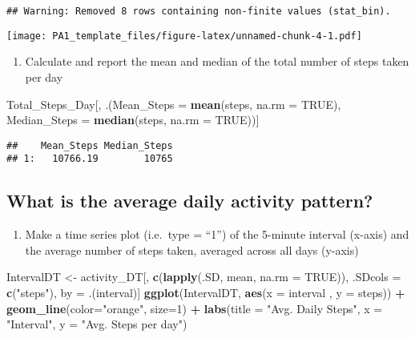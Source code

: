 \documentclass[]{article}
\newenvironment{Shaded}{\begin{snugshade}}{\end{snugshade}}
\newcommand{\KeywordTok}[1]{\textcolor[rgb]{0.13,0.29,0.53}{\textbf{#1}}}
\newcommand{\DataTypeTok}[1]{\textcolor[rgb]{0.13,0.29,0.53}{#1}}
\newcommand{\DecValTok}[1]{\textcolor[rgb]{0.00,0.00,0.81}{#1}}
\newcommand{\StringTok}[1]{\textcolor[rgb]{0.31,0.60,0.02}{#1}}
\newcommand{\OtherTok}[1]{\textcolor[rgb]{0.56,0.35,0.01}{#1}}
\newcommand{\OperatorTok}[1]{\textcolor[rgb]{0.81,0.36,0.00}{\textbf{#1}}}
\newcommand{\NormalTok}[1]{#1}
\providecommand{\tightlist}{%
  \setlength{\itemsep}{0pt}\setlength{\parskip}{0pt}}
\begin{document}
\begin{verbatim}
## Warning: Removed 8 rows containing non-finite values (stat_bin).
\end{verbatim}

\texttt{[image: PA1\_template\_files/figure-latex/unnamed-chunk-4-1.pdf]}

\begin{enumerate}
\def\labelenumi{\arabic{enumi}.}
\setcounter{enumi}{2}
\tightlist
\item
  Calculate and report the mean and median of the total number of steps
  taken per day
\end{enumerate}

\begin{Shaded}
\begin{Highlighting}[]
\NormalTok{Total_Steps_Day[, .(}\DataTypeTok{Mean_Steps =} \KeywordTok{mean}\NormalTok{(steps, }\DataTypeTok{na.rm =} \OtherTok{TRUE}\NormalTok{), }\DataTypeTok{Median_Steps =} \KeywordTok{median}\NormalTok{(steps, }\DataTypeTok{na.rm =} \OtherTok{TRUE}\NormalTok{))]}
\end{Highlighting}
\end{Shaded}

\begin{verbatim}
##    Mean_Steps Median_Steps
## 1:   10766.19        10765
\end{verbatim}

\subsection{What is the average daily activity
pattern?}\label{what-is-the-average-daily-activity-pattern}

\begin{enumerate}
\def\labelenumi{\arabic{enumi}.}
\tightlist
\item
  Make a time series plot (i.e.~type = ``1'') of the 5-minute interval
  (x-axis) and the average number of steps taken, averaged across all
  days (y-axis)
\end{enumerate}

\begin{Shaded}
\begin{Highlighting}[]
\NormalTok{IntervalDT <-}\StringTok{ }\NormalTok{activity_DT[, }\KeywordTok{c}\NormalTok{(}\KeywordTok{lapply}\NormalTok{(.SD, mean, }\DataTypeTok{na.rm =} \OtherTok{TRUE}\NormalTok{)), .SDcols =}\StringTok{ }\KeywordTok{c}\NormalTok{(}\StringTok{"steps"}\NormalTok{), by =}\StringTok{ }\NormalTok{.(interval)] }
\KeywordTok{ggplot}\NormalTok{(IntervalDT, }\KeywordTok{aes}\NormalTok{(}\DataTypeTok{x =}\NormalTok{ interval , }\DataTypeTok{y =}\NormalTok{ steps)) }\OperatorTok{+}\StringTok{ }\KeywordTok{geom_line}\NormalTok{(}\DataTypeTok{color=}\StringTok{"orange"}\NormalTok{, }\DataTypeTok{size=}\DecValTok{1}\NormalTok{) }\OperatorTok{+}\StringTok{ }\KeywordTok{labs}\NormalTok{(}\DataTypeTok{title =} \StringTok{"Avg. Daily Steps"}\NormalTok{, }\DataTypeTok{x =} \StringTok{"Interval"}\NormalTok{, }\DataTypeTok{y =} \StringTok{"Avg. Steps per day"}\NormalTok{)}
\end{Highlighting}
\end{Shaded}
\end{document}
